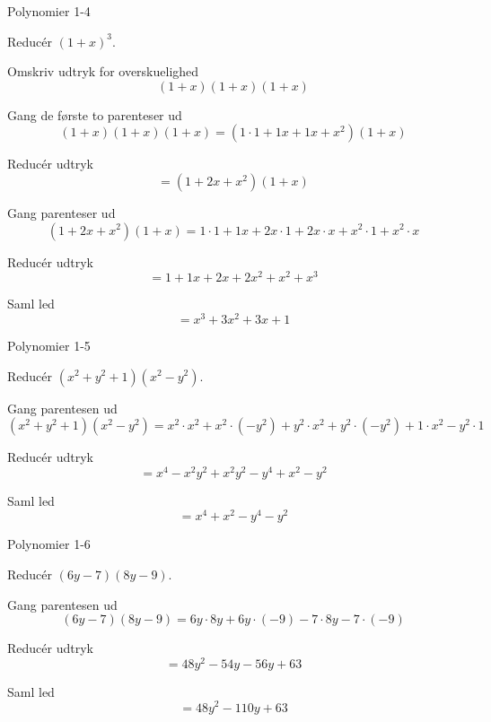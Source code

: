 \documentclass{article}
\begin{document}
\newpage

\begin{exercise}{Polynomier 1-4}
	
	Reducér $(1+x)^3$.
	
	
	\hint
	
	Omskriv udtryk for overskuelighed
	\[
	(1+x)(1+x)(1+x)
	\]
	
	\hint
	
	Gang de første to parenteser ud
	\[
	(1+x)(1+x)(1+x) = (1 \cdot 1 +1x +1x+x^2)(1+x)
	\]
	
	\hint
	
	Reducér udtryk
	\[
	= (1+2x+x^2)(1+x)
	\]
	
	\hint
	
	Gang parenteser ud
	\[
	(1+2x+x^2)(1+x) = 1 \cdot 1 + 1x +2x \cdot 1 + 2x \cdot x + x^2 \cdot 1 + x^2 \cdot x
	\]
	\hint

	Reducér udtryk
	\[
	= 1 + 1x + 2x + 2x^2 + x^2 +x^3
	\]	
	
	
	\hint
	
	Saml led
	\[
	= x^3 + 3x^2 + 3x +1
	\]
	
\end{exercise}

\newpage

\begin{exercise}{Polynomier 1-5}
	
	Reducér $(x^2+y^2+1)(x^2-y^2)$.
	
	
	\hint
	
	Gang parentesen ud
	\[
	(x^2+y^2+1)(x^2-y^2) = x^2 \cdot x^2 + x^2 \cdot (-y^2) + y^2 \cdot x^2 + y^2 \cdot (-y^2) + 1 \cdot x^2 - y^2 \cdot 1
	\]
	
	\hint
	
	Reducér udtryk
	\[
	 = x^4 -x^2 y^2 + x^2y^2 -y^4 + x^2 - y^2
	\]
	
	
	\hint
	
	Saml led
	\[
	= x^4 +x^2 - y^4 - y^2
	\]
	
\end{exercise}

\newpage

\begin{exercise}{Polynomier 1-6}
	
	Reducér $(6y-7)(8y-9)$.
	
	
	\hint
	
	Gang parentesen ud
	\[
	(6y-7)(8y-9) = 6y \cdot 8y + 6y \cdot (-9) -7 \cdot 8y - 7 \cdot (-9)
	\]
	
	\hint
	
	Reducér udtryk
	\[
	= 48y^2 -54y - 56y + 63
	\]
	
	
	\hint
	
	Saml led
	\[
	= 48y^2 - 110y + 63
	\]
	
\end{exercise}
\end{document}
